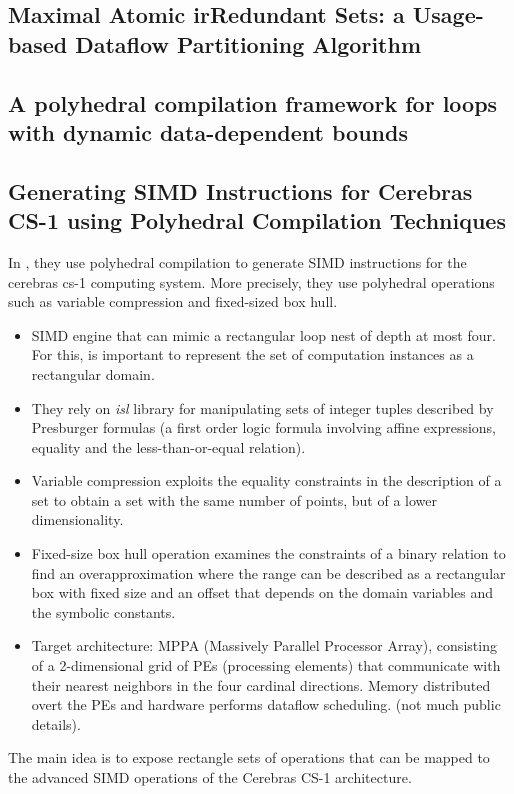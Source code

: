 \documentclass[a4paper, 11pt]{article}
\begin{document}
\subsection{Maximal Atomic irRedundant Sets: a Usage-based Dataflow Partitioning Algorithm}

\subsection{A polyhedral compilation framework for loops with dynamic data-dependent bounds}

\subsection{Generating SIMD Instructions for Cerebras CS-1 using Polyhedral Compilation Techniques}
In \cite{verdoolaege2020generating}, they use polyhedral compilation to generate SIMD instructions for the cerebras cs-1 computing system. More precisely, they use polyhedral operations such as variable compression and fixed-sized box hull.
\begin{itemize}
    \item SIMD engine that can mimic a rectangular loop nest of depth at most four. For this, is important to represent the set of computation instances as a rectangular domain.
    \item They rely on \textit{isl} library for manipulating sets of integer tuples described by Presburger formulas (a first order logic formula involving affine expressions, equality and the less-than-or-equal relation). 
    \item Variable compression exploits the equality constraints in the description of a set to obtain a set with the same number of points, but of a lower dimensionality.
    \item Fixed-size box hull operation examines the constraints of a binary relation to find an overapproximation where the range can be described as a rectangular box with fixed size and an offset that depends on the domain variables and the symbolic constants.
    \item Target architecture: MPPA (Massively Parallel Processor Array), consisting of a 2-dimensional grid of PEs (processing elements) that communicate with their nearest neighbors in the four cardinal directions. Memory distributed overt the PEs and hardware performs dataflow scheduling. (not much public details).
\end{itemize}
The main idea is to expose rectangle sets of operations that can be mapped to the advanced SIMD operations of the Cerebras CS-1 architecture.
\end{document}
